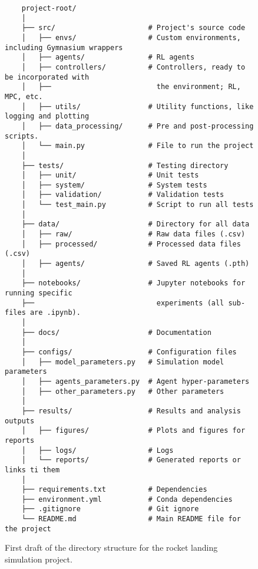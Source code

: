 \begin{figure}[H]
    \centering
    \begin{verbatim}
    project-root/
    │
    ├── src/                      # Project's source code
    │   ├── envs/                 # Custom environments, including Gymnasium wrappers
    │   ├── agents/               # RL agents
    │   ├── controllers/          # Controllers, ready to be incorporated with 
    │   ├──                         the environment; RL, MPC, etc.
    │   ├── utils/                # Utility functions, like logging and plotting
    │   ├── data_processing/      # Pre and post-processing scripts.
    │   └── main.py               # File to run the project
    │
    ├── tests/                    # Testing directory
    │   ├── unit/                 # Unit tests
    │   ├── system/               # System tests
    │   ├── validation/           # Validation tests
    │   └── test_main.py          # Script to run all tests
    │
    ├── data/                     # Directory for all data
    │   ├── raw/                  # Raw data files (.csv)
    │   ├── processed/            # Processed data files (.csv)
    │   ├── agents/               # Saved RL agents (.pth)
    │
    ├── notebooks/                # Jupyter notebooks for running specific 
    ├──                             experiments (all sub-files are .ipynb).
    │
    ├── docs/                     # Documentation
    │
    ├── configs/                  # Configuration files
    │   ├── model_parameters.py   # Simulation model parameters
    │   ├── agents_parameters.py  # Agent hyper-parameters  
    │   ├── other_parameters.py   # Other parameters  
    │
    ├── results/                  # Results and analysis outputs
    │   ├── figures/              # Plots and figures for reports
    │   ├── logs/                 # Logs
    │   └── reports/              # Generated reports or links ti them
    │
    ├── requirements.txt          # Dependencies
    ├── environment.yml           # Conda dependencies
    ├── .gitignore                # Git ignore
    └── README.md                 # Main README file for the project
    \end{verbatim}
    \caption{First draft of the directory structure for the rocket landing simulation project.}
    \label{fig:directory_structure}
\end{figure}